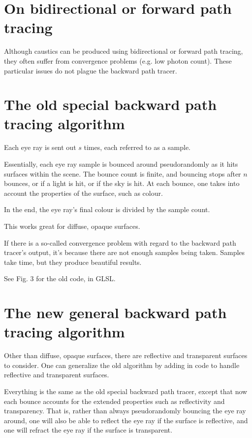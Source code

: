 \documentclass[12pt]{article}
\begin{document}
\section{On bidirectional or forward path tracing}

Although caustics can be produced using bidirectional or forward path tracing, they often suffer from convergence problems (e.g. low photon count).
These particular issues do not plague the backward path tracer.







\section{The old special backward path tracing algorithm}

Each eye ray is sent out $s$ times, each referred to as a sample.

Essentially, each eye ray sample is bounced around pseudorandomly as it hits surfaces within the scene.
The bounce count is finite, and bouncing stops after $n$ bounces, or if a light is hit, or if the sky is hit.
At each bounce, one takes into account the properties of the surface, such as colour.

In the end, the eye ray's final colour is divided by the sample count.

This works great for diffuse, opaque surfaces.

If there is a so-called convergence problem with regard to the backward path tracer's output, it's because there are not enough samples being taken.
Samples take time, but they produce beautiful results.

See Fig. 3 for the old code, in GLSL.





\section{The new general backward path tracing algorithm}

Other than diffuse, opaque surfaces, there are reflective and transparent surfaces to consider.
One can generalize the old algorithm by adding in code to handle reflective and transparent surfaces.

Everything is the same as the old special backward path tracer, except that now each bounce accounts for the extended properties such as reflectivity and transparency.
That is, rather than always pseudorandomly bouncing the eye ray around, one will also be able to reflect the eye ray if the surface is reflective, and one will refract the eye ray if the surface is transparent.
\end{document}
